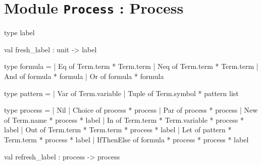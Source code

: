 \section{Module {\tt{Process}} : Process}
\label{module:Process}




\ocamldocvspace{0.5cm}



\label{type:Process.label}\begin{ocamldoccode}
type label 
\end{ocamldoccode}




\label{val:Process.fresh-underscorelabel}\begin{ocamldoccode}
val fresh_label : unit -> label
\end{ocamldoccode}




\label{type:Process.formula}\begin{ocamldoccode}
type formula =
  | Eq of Term.term * Term.term
  | Neq of Term.term * Term.term
  | And of formula * formula
  | Or of formula * formula
\end{ocamldoccode}




\label{type:Process.pattern}\begin{ocamldoccode}
type pattern =
  | Var of Term.variable
  | Tuple of Term.symbol * pattern list
\end{ocamldoccode}




\label{type:Process.process}\begin{ocamldoccode}
type process =
  | Nil
  | Choice of process * process
  | Par of process * process
  | New of Term.name * process * label
  | In of Term.term * Term.variable * process * label
  | Out of Term.term * Term.term * process * label
  | Let of pattern * Term.term * process * label
  | IfThenElse of formula * process * process * label
\end{ocamldoccode}




\label{val:Process.refresh-underscorelabel}\begin{ocamldoccode}
val refresh_label : process -> process
\end{ocamldoccode}




